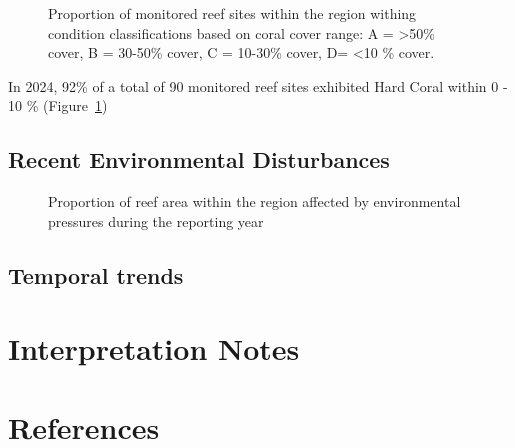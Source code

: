 \documentclass[
  letterpaper,
  DIV=11,
  numbers=noendperiod]{scrartcl}
\begin{document}
\begin{figure}[H]


\caption{\label{fig-waffle}Proportion of monitored reef sites within the
region withing condition classifications based on coral cover range: A =
\textgreater50\% cover, B = 30-50\% cover, C = 10-30\% cover, D=
\textless10 \% cover.}

\end{figure}%

In 2024, 92\% of a total of 90 monitored reef sites exhibited Hard Coral
within 0 - 10 \% (Figure~\ref{fig-waffle})

\subsection{Recent Environmental
Disturbances}\label{recent-environmental-disturbances}

\begin{figure}[H]


\caption{\label{fig-env_dist}Proportion of reef area within the region
affected by environmental pressures during the reporting year}

\end{figure}%

\subsection{Temporal trends}\label{temporal-trends}

\pagebreak

\section{Interpretation Notes}\label{interpretation-notes}

\pagebreak

\section{References}\label{references}
\end{document}

